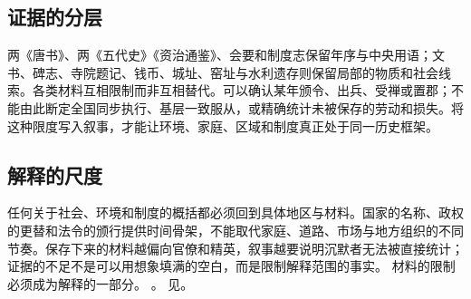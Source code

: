 \subsection{证据的分层}
两《唐书》、两《五代史》《资治通鉴》、会要和制度志保留年序与中央用语；文书、碑志、寺院题记、钱币、城址、窑址与水利遗存则保留局部的物质和社会线索。各类材料互相限制而非互相替代。可以确认某年颁令、出兵、受禅或置郡；不能由此断定全国同步执行、基层一致服从，或精确统计未被保存的劳动和损失。将这种限度写入叙事，才能让环境、家庭、区域和制度真正处于同一历史框架。
\subsection{解释的尺度} 任何关于社会、环境和制度的概括都必须回到具体地区与材料。国家的名称、政权的更替和法令的颁行提供时间骨架，不能取代家庭、道路、市场与地方组织的不同节奏。保存下来的材料越偏向官僚和精英，叙事越要说明沉默者无法被直接统计；证据的不足不是可以用想象填满的空白，而是限制解释范围的事实。
材料的限制必须成为解释的一部分。
。
见。
